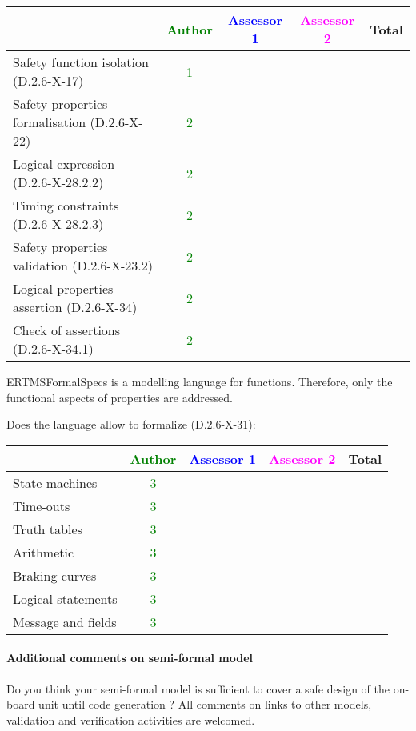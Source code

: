 \begin{author_comment}
\begin{tabular}{|l | c | c | c | c|}
\hline
& \textcolor{green}{Author} & \textcolor{blue}{Assessor 1} & \textcolor{magenta}{Assessor 2} & Total \\
\hline 
Safety function isolation (D.2.6-X-17)  & \textcolor{green}{1} & & &  \\
\hline 
Safety properties formalisation (D.2.6-X-22)  & \textcolor{green}{2} & & &  \\
\hline
Logical expression (D.2.6-X-28.2.2)  & \textcolor{green}{2} & & &  \\
\hline
Timing constraints (D.2.6-X-28.2.3)  & \textcolor{green}{2} & & &  \\
\hline
Safety properties validation (D.2.6-X-23.2)  & \textcolor{green}{2} & & &  \\
\hline
Logical properties assertion (D.2.6-X-34)  & \textcolor{green}{2} & & &  \\
\hline
Check  of assertions (D.2.6-X-34.1)  & \textcolor{green}{2} & & &  \\
\hline
\end{tabular}

\begin{author_comment}
ERTMSFormalSpecs is a modelling language for functions. Therefore, only the functional aspects of properties are addressed.  
\end{author_comment}
Does the language allow to  formalize (D.2.6-X-31):

\begin{tabular}{|l | c | c | c | c|}
\hline
& \textcolor{green}{Author} & \textcolor{blue}{Assessor 1} & \textcolor{magenta}{Assessor 2} & Total \\
\hline 
State machines  & \textcolor{green}{3} & & &  \\
\hline
Time-outs  & \textcolor{green}{3} & & &  \\
\hline
Truth tables  & \textcolor{green}{3} & & &  \\
\hline
Arithmetic  & \textcolor{green}{3} & & &  \\
\hline
Braking curves  & \textcolor{green}{3} & & &  \\
\hline
Logical statements & \textcolor{green}{3} & & &  \\
\hline
Message and fields & \textcolor{green}{3} & & &  \\
\hline
\end{tabular}

\paragraph{Additional comments on semi-formal  model} Do you think your semi-formal  model is sufficient to cover a safe design of the on-board unit until code generation ?
All comments on links to  other models, validation and verification activities are welcomed.


\end{author_comment}
